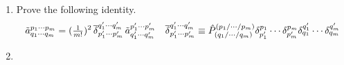 \documentclass[11pt]{article}
\numberwithin{equation}{section}
\begin{document}
\begin{enumerate}
\item
  Prove the following identity.
\begin{align*}
  \tilde{a}^{p_1\cdots p_m}_{q_1\cdots q_m}
=
  (\tfrac{1}{m!})^2\,
  \overline{\delta }_{p_1'\cdots p_m'}^{q_1'\cdots q_m'}\,
  \tilde{a}^{p_1'\cdots p_m'}_{q_1'\cdots q_m'}
&&
  \overline{\delta }^{q_1'\cdots q_m'}_{p_1'\cdots p_m'}
\equiv
  \hat{P}^{(p_1/\cdots /p_m)}
        _{(q_1/\cdots /q_m)}
  \delta ^{p_1}_{p_1'}\cdots \delta ^{p_m}_{p_m'}
  \delta ^{q_1'}_{q_1}\cdots \delta ^{q_m'}_{q_m}
\end{align*}

\item
  
\end{enumerate}
\end{document}
